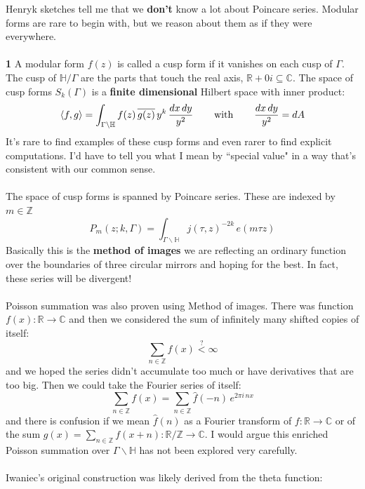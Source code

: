 \documentclass[12pt]{article}
\begin{document}
\noindent Henryk sketches tell me that we \textbf{don't} know a lot about Poincare series.  Modular forms are rare to begin with, but we reason about them as if they were everywhere.    \\ \\
\textbf{1} A modular form $f(z)$ is called a {\color{blue}cusp form} if it vanishes on each cusp of $\Gamma$. The cusp of $\mathbb{H}/\Gamma$ are the parts that touch the real axis, $\mathbb{R} + 0i \subseteq \mathbb{C}$.  The space of cusp forms $S_k(\Gamma)$ is a \textbf{finite dimensional} Hilbert space  with inner product:
$$\langle f,g \rangle = \int_{\Gamma \backslash \mathbb{H}}  f(z) \, \overline{g(z)} \, y^k \, \frac{dx \, dy}{y^2} \hspace{0.25in}\text{ with }\hspace{0.25in}\frac{dx \, dy}{y^2}=dA $$
It's rare to find examples of these cusp forms and even rarer to find explicit computations.  I'd have to tell you what I mean by ``special value" in a way that's consistent with our common sense. \\ \\
The space of cusp forms is spanned by Poincare series.  These are indexed by $m \in \mathbb{Z}$
$$ P_m (z; k , \Gamma ) = \int_{\Gamma \backslash \mathbb{H}} j (\tau, z)^{-2k} \, e(m \tau z) $$
Basically this is the \textbf{method of images} we are reflecting an ordinary function over the boundaries of three circular mirrors and hoping for the best.  In fact, these series will be divergent! \\ \\
Poisson summation was also proven using Method of images.  There was function $f(x): \mathbb{R} \to \mathbb{C}$ and then we considered the sum of infinitely many shifted copies of itself:
$$  \sum_{n \in \mathbb{Z}} f(x) \stackrel{?}{<} \infty  $$
and we hoped the series didn't accumulate too much or have derivatives that are too big.  Then we could take the Fourier series of itself:
$$  \sum_{n \in \mathbb{Z}} f(x)  = \sum_{n \in \mathbb{Z}} \widehat{f}(-n) \, e^{2\pi i \, n x} $$
and there is confusion if we mean $\widehat{f}(n)$ as a Fourier transform of  $f: \mathbb{R} \to \mathbb{C}$ or of the sum $g(x) = \sum_{n \in \mathbb{Z}} f(x+n): \mathbb{R}/\mathbb{Z} \to \mathbb{C}$. I would argue this enriched Poisson summation over $\Gamma \backslash \mathbb{H}$ has not been explored very carefully. \\ \\
Iwaniec's original construction was likely derived from the theta function:
\end{document}
